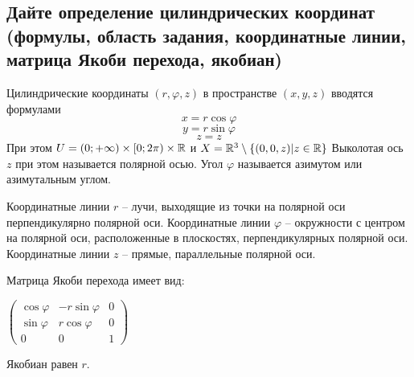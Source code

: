 \subsection{Дайте определение цилиндрических координат (формулы, область задания, координатные линии, матрица Якоби перехода, якобиан)}

Цилиндрические координаты $(r, \varphi, z)$ в пространстве $(x, y, z)$ вводятся формулами
\[ x = r \cos \varphi \]
\[ y = r \sin \varphi \]
\[ z = z \]
При этом $U = (0; +\infty) \times [0; 2\pi) \times \mathbb{R}$ и $X = \mathbb{R}^3 \setminus \{(0, 0, z) | z \in \mathbb{R} \}$
Выколотая ось $z$ при этом называется полярной осью. Угол $\varphi$ называется азимутом или азимутальным углом.

Координатные линии $r$ -- лучи, выходящие из точки на полярной оси перпендикулярно полярной оси. Координатные линии $\varphi$ --
окружности с центром на полярной оси, расположенные в плоскостях, перпендикулярных полярной оси. Координатные линии $z$ -- прямые,
параллельные полярной оси.

Матрица Якоби перехода имеет вид:

$
\begin{pmatrix}
    \cos \varphi & -r \sin \varphi & 0\\
    \sin \varphi & r \cos \varphi  & 0\\
    0            & 0               & 1
\end{pmatrix}
$

Якобиан равен $r$.